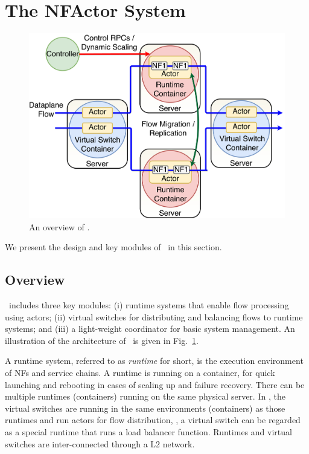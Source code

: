 \section {The NFActor System}

\begin{figure}[!t]
  \centering
  \includegraphics[width=\columnwidth]{figure/new-nfactor-cluster.pdf}
  \caption{An overview of \nfactor.}
  \label{fig:runtime}
\end{figure}

We present the design and key modules of \nfactor~in this section.

\subsection{Overview}
\label{sec:overview}

\nfactor~includes three key modules: (i) runtime systems that enable flow processing using actors; (ii) virtual switches for distributing and balancing flows to runtime systems; and (iii) a light-weight coordinator for basic system management. %
 An illustration of the architecture of \nfactor~is given in Fig.~\ref{fig:runtime}.

A runtime system, referred to as \textit{runtime} for short, is the execution environment of NFs and service chains. A runtime is running on a container, for quick launching and rebooting in cases of scaling up and failure recovery. There can be multiple runtimes (containers) running on the same physical server. In \nfactor, the virtual switches are running in the same environments (containers) as those runtimes and run actors for flow distribution, \ie, a virtual switch can be regarded as a special runtime that runs a load balancer function. Runtimes and virtual switches are inter-connected through a L2 network.

